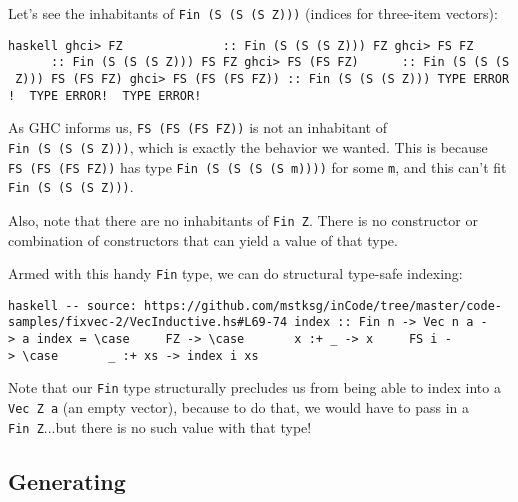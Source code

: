\documentclass[]{article}
\begin{document}
Let's see the inhabitants of
\texttt{Fin\ (\textquotesingle{}S\ (\textquotesingle{}S\ (\textquotesingle{}S\ \textquotesingle{}Z)))}
(indices for three-item vectors):

\texttt{haskell\ ghci\textgreater{}\ FZ\ \ \ \ \ \ \ \ \ \ \ \ \ \ ::\ Fin\ (\textquotesingle{}S\ (\textquotesingle{}S\ (\textquotesingle{}S\ \textquotesingle{}Z)))\ FZ\ ghci\textgreater{}\ FS\ FZ\ \ \ \ \ \ \ \ \ \ \ ::\ Fin\ (\textquotesingle{}S\ (\textquotesingle{}S\ (\textquotesingle{}S\ \textquotesingle{}Z)))\ FS\ FZ\ ghci\textgreater{}\ FS\ (FS\ FZ)\ \ \ \ \ \ ::\ Fin\ (\textquotesingle{}S\ (\textquotesingle{}S\ (\textquotesingle{}S\ \textquotesingle{}Z)))\ FS\ (FS\ FZ)\ ghci\textgreater{}\ FS\ (FS\ (FS\ FZ))\ ::\ Fin\ (\textquotesingle{}S\ (\textquotesingle{}S\ (\textquotesingle{}S\ \textquotesingle{}Z)))\ TYPE\ ERROR!\ \ TYPE\ ERROR!\ \ TYPE\ ERROR!}

As GHC informs us, \texttt{FS\ (FS\ (FS\ FZ))} is not an inhabitant of
\texttt{Fin\ (\textquotesingle{}S\ (\textquotesingle{}S\ (\textquotesingle{}S\ \textquotesingle{}Z)))},
which is exactly the behavior we wanted. This is because
\texttt{FS\ (FS\ (FS\ FZ))} has type
\texttt{Fin\ (\textquotesingle{}S\ (\textquotesingle{}S\ (\textquotesingle{}S\ (\textquotesingle{}S\ m))))}
for some \texttt{m}, and this can't fit
\texttt{Fin\ (\textquotesingle{}S\ (\textquotesingle{}S\ (\textquotesingle{}S\ \textquotesingle{}Z)))}.

Also, note that there are no inhabitants of \texttt{Fin\ \textquotesingle{}Z}.
There is no constructor or combination of constructors that can yield a value of
that type.

Armed with this handy \texttt{Fin} type, we can do structural type-safe
indexing:

\texttt{haskell\ -\/-\ source:\ https://github.com/mstksg/inCode/tree/master/code-samples/fixvec-2/VecInductive.hs\#L69-74\ index\ ::\ Fin\ n\ -\textgreater{}\ Vec\ n\ a\ -\textgreater{}\ a\ index\ =\ \textbackslash{}case\ \ \ \ \ FZ\ -\textgreater{}\ \textbackslash{}case\ \ \ \ \ \ \ x\ :+\ \_\ -\textgreater{}\ x\ \ \ \ \ FS\ i\ -\textgreater{}\ \textbackslash{}case\ \ \ \ \ \ \ \_\ :+\ xs\ -\textgreater{}\ index\ i\ xs}

Note that our \texttt{Fin} type structurally precludes us from being able to
index into a \texttt{Vec\ \textquotesingle{}Z\ a} (an empty vector), because to
do that, we would have to pass in a \texttt{Fin\ \textquotesingle{}Z}...but
there is no such value with that type!

\subsection{Generating}
\end{document}
